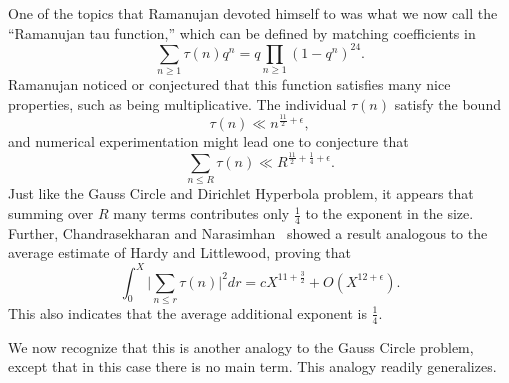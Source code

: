 One of the topics that Ramanujan devoted himself to was what we now call the ``Ramanujan
tau function,''
which can be defined by matching coefficients in
\begin{equation}
  \sum_{n \geq 1} \tau(n) q^n = q \prod_{n \geq 1} (1 - q^n)^{24}.
\end{equation}
Ramanujan noticed or conjectured that this function satisfies many nice properties,
such as being multiplicative.
The individual $\tau(n)$ satisfy the bound
\begin{equation}
  \tau(n) \ll n^{\frac{11}{2} + \epsilon},
\end{equation}
and numerical experimentation might lead one to conjecture that
\begin{equation}
  \sum_{n \leq R} \tau(n) \ll R^{\frac{11}{2} + \frac{1}{4} + \epsilon}.
\end{equation}
Just like the Gauss Circle and Dirichlet Hyperbola problem, it appears that summing over
$R$ many terms contributes only $\frac{1}{4}$ to the exponent in the size.
Further, Chandrasekharan and Narasimhan~\cite{chandrasekharan1962functional,
chandrasekharan1964mean} showed a result analogous to the average estimate of Hardy and
Littlewood, proving that
\begin{equation}
  \int_0^X \big\lvert \sum_{n \leq r} \tau(n) \big\rvert^2 dr = c X^{11 + \frac{3}{2}} + O(X^{12 +
  \epsilon}).
\end{equation}
This also indicates that the average additional exponent is $\frac{1}{4}$.



We now recognize that this is another analogy to the Gauss Circle problem, except that in
this case there is no main term.
This analogy readily generalizes.


